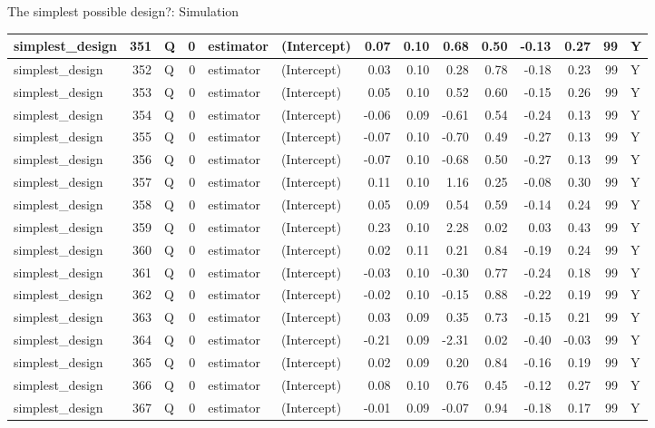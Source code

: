 \documentclass[
  11pt,
  ignorenonframetext,
]{beamer}
\begin{document}
\begin{frame}[fragile]{The simplest possible design?: Simulation}
\begin{tabular}{l|r|l|r|l|l|r|r|r|r|r|r|r|l}
\hline
simplest\_design & 351 & Q & 0 & estimator & (Intercept) & 0.07 & 0.10 & 0.68 & 0.50 & -0.13 & 0.27 & 99 & Y\\
\hline
simplest\_design & 352 & Q & 0 & estimator & (Intercept) & 0.03 & 0.10 & 0.28 & 0.78 & -0.18 & 0.23 & 99 & Y\\
\hline
simplest\_design & 353 & Q & 0 & estimator & (Intercept) & 0.05 & 0.10 & 0.52 & 0.60 & -0.15 & 0.26 & 99 & Y\\
\hline
simplest\_design & 354 & Q & 0 & estimator & (Intercept) & -0.06 & 0.09 & -0.61 & 0.54 & -0.24 & 0.13 & 99 & Y\\
\hline
simplest\_design & 355 & Q & 0 & estimator & (Intercept) & -0.07 & 0.10 & -0.70 & 0.49 & -0.27 & 0.13 & 99 & Y\\
\hline
simplest\_design & 356 & Q & 0 & estimator & (Intercept) & -0.07 & 0.10 & -0.68 & 0.50 & -0.27 & 0.13 & 99 & Y\\
\hline
simplest\_design & 357 & Q & 0 & estimator & (Intercept) & 0.11 & 0.10 & 1.16 & 0.25 & -0.08 & 0.30 & 99 & Y\\
\hline
simplest\_design & 358 & Q & 0 & estimator & (Intercept) & 0.05 & 0.09 & 0.54 & 0.59 & -0.14 & 0.24 & 99 & Y\\
\hline
simplest\_design & 359 & Q & 0 & estimator & (Intercept) & 0.23 & 0.10 & 2.28 & 0.02 & 0.03 & 0.43 & 99 & Y\\
\hline
simplest\_design & 360 & Q & 0 & estimator & (Intercept) & 0.02 & 0.11 & 0.21 & 0.84 & -0.19 & 0.24 & 99 & Y\\
\hline
simplest\_design & 361 & Q & 0 & estimator & (Intercept) & -0.03 & 0.10 & -0.30 & 0.77 & -0.24 & 0.18 & 99 & Y\\
\hline
simplest\_design & 362 & Q & 0 & estimator & (Intercept) & -0.02 & 0.10 & -0.15 & 0.88 & -0.22 & 0.19 & 99 & Y\\
\hline
simplest\_design & 363 & Q & 0 & estimator & (Intercept) & 0.03 & 0.09 & 0.35 & 0.73 & -0.15 & 0.21 & 99 & Y\\
\hline
simplest\_design & 364 & Q & 0 & estimator & (Intercept) & -0.21 & 0.09 & -2.31 & 0.02 & -0.40 & -0.03 & 99 & Y\\
\hline
simplest\_design & 365 & Q & 0 & estimator & (Intercept) & 0.02 & 0.09 & 0.20 & 0.84 & -0.16 & 0.19 & 99 & Y\\
\hline
simplest\_design & 366 & Q & 0 & estimator & (Intercept) & 0.08 & 0.10 & 0.76 & 0.45 & -0.12 & 0.27 & 99 & Y\\
\hline
simplest\_design & 367 & Q & 0 & estimator & (Intercept) & -0.01 & 0.09 & -0.07 & 0.94 & -0.18 & 0.17 & 99 & Y\\

\end{tabular}
\end{frame}
\end{document}
